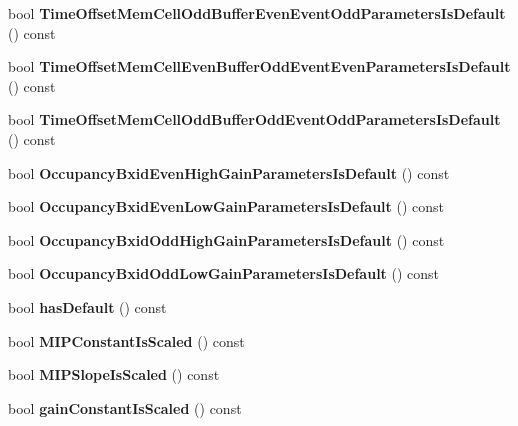 \begin{DoxyCompactItemize}
\item 
bool {\bfseries Time\-Offset\-Mem\-Cell\-Odd\-Buffer\-Even\-Event\-Odd\-Parameters\-Is\-Default} () const \label{classCALICE_1_1Ahc2CalibrationStatusBits_a9f1129a9f6663d589af8bf6930d8f1eb}

\item 
bool {\bfseries Time\-Offset\-Mem\-Cell\-Even\-Buffer\-Odd\-Event\-Even\-Parameters\-Is\-Default} () const \label{classCALICE_1_1Ahc2CalibrationStatusBits_ac51b8d18c3ed74de8add3db7b8c214a1}

\item 
bool {\bfseries Time\-Offset\-Mem\-Cell\-Odd\-Buffer\-Odd\-Event\-Odd\-Parameters\-Is\-Default} () const \label{classCALICE_1_1Ahc2CalibrationStatusBits_a6454643883a416920df36d2be71702f4}

\item 
bool {\bfseries Occupancy\-Bxid\-Even\-High\-Gain\-Parameters\-Is\-Default} () const \label{classCALICE_1_1Ahc2CalibrationStatusBits_adc225f8763ea2bc1f3c15b2829a3d540}

\item 
bool {\bfseries Occupancy\-Bxid\-Even\-Low\-Gain\-Parameters\-Is\-Default} () const \label{classCALICE_1_1Ahc2CalibrationStatusBits_ad536d122a837b7dbd06ab0135b2534b7}

\item 
bool {\bfseries Occupancy\-Bxid\-Odd\-High\-Gain\-Parameters\-Is\-Default} () const \label{classCALICE_1_1Ahc2CalibrationStatusBits_a7db60192fcf8ec3f69038350d0ea2002}

\item 
bool {\bfseries Occupancy\-Bxid\-Odd\-Low\-Gain\-Parameters\-Is\-Default} () const \label{classCALICE_1_1Ahc2CalibrationStatusBits_a62dc3097c52f7ec47e20ea2e9f7571d9}

\item 
bool {\bfseries has\-Default} () const \label{classCALICE_1_1Ahc2CalibrationStatusBits_abc660f877930fa42c2e8527dcff5d2d7}

\item 
bool {\bfseries M\-I\-P\-Constant\-Is\-Scaled} () const \label{classCALICE_1_1Ahc2CalibrationStatusBits_a7c8965a803ecec5750d1c230d3276ce9}

\item 
bool {\bfseries M\-I\-P\-Slope\-Is\-Scaled} () const \label{classCALICE_1_1Ahc2CalibrationStatusBits_a5ab7245b3e09f28776a5456796e7fa2e}

\item 
bool {\bfseries gain\-Constant\-Is\-Scaled} () const \label{classCALICE_1_1Ahc2CalibrationStatusBits_a4590015de61eadec69155b6f052785ef}


\end{DoxyCompactItemize}
